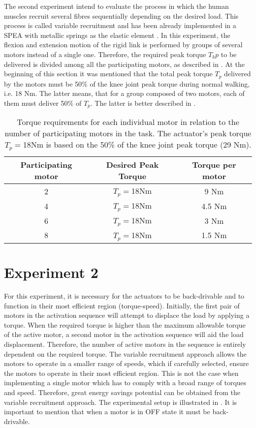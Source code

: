 The second experiment intend to evaluate the process in which the human muscles recruit several fibres sequentially depending on the desired load. This process is called variable recruitment and has been already implemented in a SPEA with metallic springs as the elastic element \cite{mathijssen2014variable}. In this experiment, the flexion and extension motion of the rigid link is performed by groups of several motors instead of a single one. Therefore, the required peak torque $T_kp$  to be delivered is divided among all the participating motors, as described in . At the beginning of this section it was mentioned that the total peak torque $T_p$   delivered by the motors must be 50\% of the knee joint peak torque during normal walking, i.e. 18 Nm. The latter means, that for a group composed of two motors, each of them must deliver 50\% of $T_p$. The latter is better described in .

\begin{table}[hbt!]
    \centering
    \begin{tabular}{ccc}
    \toprule
    Participating motor & Desired Peak Torque   & Torque per motor\\
    \hline
        2   &  $T_p=$18Nm   & 9 Nm\\
        4   &  $T_p=$18Nm   & 4.5 Nm\\
        6   &  $T_p=$18Nm   & 3 Nm\\
        8   &  $T_p=$18Nm   & 1.5 Nm\\
    \bottomrule
    \end{tabular}
    \caption{Torque requirements for each individual motor in relation to the number of participating motors in the task. The actuator's peak torque $T_p=$18Nm is based on the 50\% of the knee joint peak torque (29 Nm).}
    \label{tab:table1}
\end{table}

\section{Experiment 2}

For this experiment, it is necessary for the actuators to be back-drivable and to function in their most efficient region (torque-speed). Initially, the first pair of motors in the activation sequence will attempt to displace the load by applying a torque. When the required torque is higher than the maximum allowable torque of the active motor, a second motor in the activation sequence will aid the load displacement. Therefore, the number of active motors in the sequence is entirely dependent on the required torque. The variable recruitment approach allows the motors to operate in a smaller range of speeds, which if carefully selected, ensure the motors to operate in their most efficient region. This is not the case when implementing a single motor which has to comply with a broad range of torques and speed. Therefore, great energy savings potential can be obtained from the variable recruitment approach. The experimental setup is illustrated in . It is important to mention that when a motor is in OFF state it must be back-drivable.

